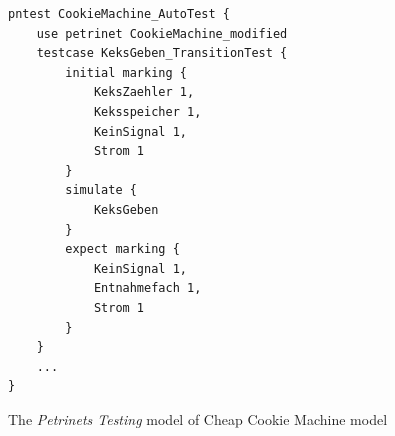 \begin{lstfloat}
	\centering
    \begin{lstlisting}[style=mcgrammar]
pntest CookieMachine_AutoTest { 
    use petrinet CookieMachine_modified
    testcase KeksGeben_TransitionTest {
        initial marking {
            KeksZaehler 1,
            Keksspeicher 1,
            KeinSignal 1,
            Strom 1
        }
        simulate {
            KeksGeben
        }
        expect marking {
            KeinSignal 1,
            Entnahmefach 1,
            Strom 1
        }
    }
    ...
}
    \end{lstlisting}
	\caption{The \emph{Petrinets Testing} model of Cheap Cookie Machine model}
	\label{lst:pnt-Cheap Cookie Machine}
\end{lstfloat}